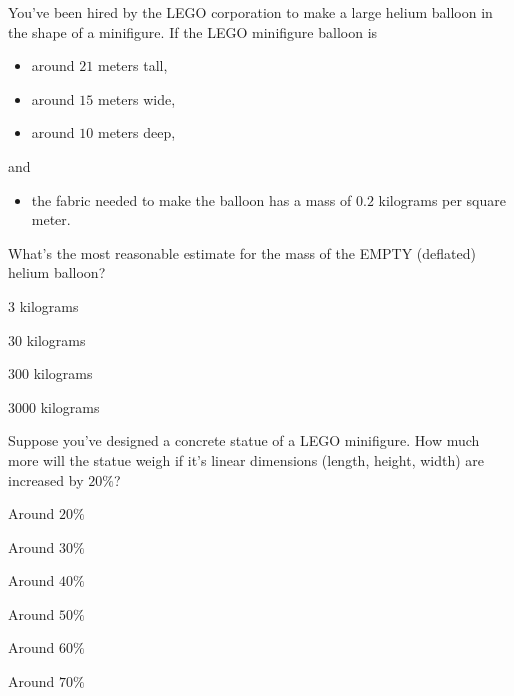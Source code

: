 \documentclass{ximera}
\author{Bart Snapp}
\begin{document}
\maketitle


\begin{exercise}
  You've been hired by the LEGO corporation to make a large helium
  balloon in the shape of a minifigure. If the LEGO minifigure balloon
  is
\begin{itemize}
    \item around $21$ meters tall,
    \item around $15$ meters wide,
    \item around $10$ meters deep,
\end{itemize}
and
\begin{itemize}
\item the fabric needed to make the balloon has a mass of $0.2$ kilograms per square meter.
\end{itemize}
What's the most reasonable estimate for the mass of the EMPTY
(deflated) helium balloon?
\begin{enumerate}\begin{multicols}{2}
  \item $3$ kilograms
  \item $30$ kilograms
  \item $300$ kilograms
  \item $3000$ kilograms
  \end{multicols}
\end{enumerate}
\end{exercise}





\begin{exercise}
  Suppose you've designed a concrete statue of a LEGO minifigure.  How
  much more will the statue weigh if it's linear dimensions (length,
  height, width) are increased by $20\%$?
  \begin{enumerate}\begin{multicols}{2}
    \item Around $20\%$
    \item Around $30\%$
    \item Around $40\%$
    \item Around $50\%$
    \item Around $60\%$
    \item Around $70\%$
    \end{multicols}
  \end{enumerate}
\end{exercise}
\end{document}
